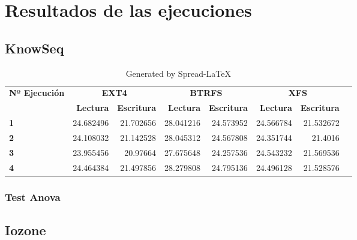\chapter{Resultados de las ejecuciones}
\section{KnowSeq}\label{resultados_knowseq}

\begin{table}[!htp]\centering
\caption{Generated by Spread-LaTeX}\label{tab: }
\scriptsize
\begin{tabular}{lrrrrrrr}\toprule
\textbf{Nº Ejecución} &\multicolumn{2}{c}{\textbf{EXT4}} &\multicolumn{2}{c}{\textbf{BTRFS}} &\multicolumn{2}{c}{\textbf{XFS}} \\\cmidrule{1-7}
&\textbf{Lectura} &\textbf{Escritura} &\textbf{Lectura} &\textbf{Escritura} &\textbf{Lectura} &\textbf{Escritura} \\\midrule
\textbf{1} &24.682496 &21.702656 &28.041216 &24.573952 &24.566784 &21.532672 \\
\textbf{2} &24.108032 &21.142528 &28.045312 &24.567808 &24.351744 &21.4016 \\
\textbf{3} &23.955456 &20.97664 &27.675648 &24.257536 &24.543232 &21.569536 \\
\textbf{4} &24.464384 &21.497856 &28.279808 &24.795136 &24.496128 &21.528576 \\
\bottomrule
\end{tabular}
\end{table}


\subsection{Test Anova}

\section{Iozone}
